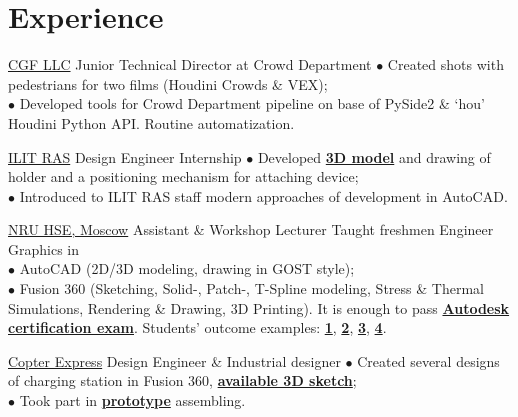 \documentclass[]{cv-class}
\begin{document}
\begin{minipage}[t]{0.64\textwidth} 

\section{Experience}
    {\href{http://www.cgfww.com/}{CGF LLC}}
    {Junior Technical Director at Crowd Department}
    {\textcolor{bullet_col}{$\bullet$} Created shots with pedestrians for two films (Houdini Crowds \& VEX); \\
    \textcolor{bullet_col}{$\bullet$} Developed tools for Crowd Department pipeline on base of PySide2 \& `hou' Houdini Python API. Routine automatization.
    \\
    }

    {\href{https://crys.ras.ru}{ILIT RAS}}
    {Design Engineer Internship}
    {\textcolor{bullet_col}{$\bullet$} Developed \href{https://myhub.autodesk360.com/ue2971508/g/shares/SHabee1QT1a327cf2b7ada7a5a5e1c2f10c0}{\textbf{3D model}} and drawing of holder and a positioning mechanism for attaching device;\\
    \textcolor{bullet_col}{$\bullet$} Introduced to ILIT RAS staff modern approaches of development in AutoCAD.
    \\}

    {\href{https://www.hse.ru/en/}{NRU HSE, Moscow}}
    {Assistant \& Workshop Lecturer}
    {Taught freshmen Engineer Graphics in\\
    \textcolor{bullet_col}{$\bullet$} AutoCAD (2D/3D modeling, drawing in GOST style); \\
    \textcolor{bullet_col}{$\bullet$} Fusion 360 (Sketching, Solid-, Patch-, T-Spline modeling, Stress \& Thermal Simulations, Rendering \& Drawing, 3D Printing). It is enough to pass  \href{http://downloads.certiport.com/marketing/Autodesk/doc/ACU_Fusion_360.pdf}{\textbf{Autodesk certification exam}}. Students' outcome  examples: \href{https://gallery.autodesk.com/projects/mountain-bike-2}{\textbf{1}}, \href{https://gallery.autodesk.com/projects/corvette-c6}{\textbf{2}}, \href{https://gallery.autodesk.com/projects/stranded-beast}{\textbf{3}}, \href{https://gallery.autodesk.com/projects/star-wars-arc-170}{\textbf{4}}.
    \\}

    {\href{https://copterexpress.com/}{Copter Express}}
    {Design Engineer \& Industrial designer}
    {\textcolor{bullet_col}{$\bullet$} Created several designs of charging station in Fusion 360, \href{https://myhub.autodesk360.com/ue2971508/shares/public/SHabee1QT1a327cf2b7a7d7742f9b8a0285b}{\textbf{available 3D sketch}}; \\
    \textcolor{bullet_col}{$\bullet$} Took part in \href{https://www.youtube.com/watch?v=RjX6nUqw1mI}{\textbf{prototype}} assembling.
    }


\end{minipage}
\end{document}
